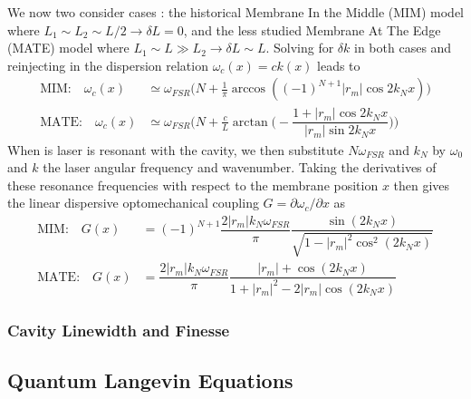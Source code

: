 We now two consider cases : the historical Membrane In the Middle (MIM) model where $L_1 \sim L_2 \sim L/2 \rightarrow \delta L = 0 $, and the less studied Membrane At The Edge (MATE) model where $L_1 \sim L \gg L_2 \rightarrow \delta L \sim L$. Solving for $\delta k$ in both cases and reinjecting in the dispersion relation $\omega_c(x) = c k(x)$ leads to
\begin{equation}
  \begin{split}
    \text{MIM:} \quad \omega_c(x) & \simeq \omega_{FSR} \Bigg(N  + \frac{1}{\pi} \arccos( (-1)^{N+1}|r_m| \cos 2 k_N  x) \Bigg) \\
    \text{MATE:} \quad \omega_c(x) & \simeq \omega_{FSR} \Bigg( N  + \frac{c}{L} \arctan \bigg( -  \dfrac{1 + |r_m|\cos 2 k_N  x}{|r_m|\sin 2 k_N x} \bigg)\Bigg)
  \end{split}
\end{equation}
When is laser is resonant with the cavity, we then substitute $N \omega_{FSR}$ and $k_N$ by $\omega_0$ and $k$ the laser angular frequency and wavenumber. Taking the derivatives of these resonance frequencies with respect to the membrane position \(x\) then gives the linear dispersive optomechanical coupling \(G = \partial \omega_c/\partial x\) as
\begin{equation}
  \begin{split}
    \text{MIM:} \quad G(x) & =  (-1)^{N+1} \dfrac{2 |r_m|  k_N \omega_{FSR}}{\pi} \dfrac{\sin( 2 k_N  x)}{\sqrt{1 - |r_m|^2 \cos^2( 2 k_N  x)}} \\
    \text{MATE:} \quad G(x) & = \dfrac{2 |r_m|  k_N \omega_{FSR}}{\pi}  \dfrac{|r_m|  + \cos( 2 k_N  x)}{1 + |r_m|^2 - 2 |r_m| \cos( 2 k_N  x)}
  \end{split}
\end{equation}
\subsubsection{Cavity Linewidth and Finesse}

\subsection{Quantum Langevin Equations}


